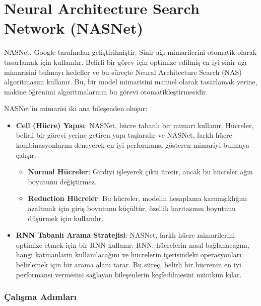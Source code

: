 \section{Neural Architecture Search Network (NASNet)}

NASNet, Google tarafından geliştirilmiştir. Sinir ağı mimarilerini otomatik olarak tasarlamak için kullanılır. Belirli bir görev için optimize edilmiş en iyi sinir ağı mimarisini bulmayı hedefler ve bu süreçte Neural Architecture Search (NAS) algoritmasını kullanır. Bu, bir model mimarisini manuel olarak tasarlamak yerine, makine öğrenimi algoritmalarının bu görevi otomatikleştirmesidir.

NASNet'in mimarisi iki ana bileşenden oluşur:

\begin{itemize}
    \item \textbf{Cell (Hücre) Yapısı}: NASNet, hücre tabanlı bir mimari kullanır. Hücreler, belirli bir görevi yerine getiren yapı taşlarıdır ve NASNet, farklı hücre kombinasyonlarını deneyerek en iyi performansı gösteren mimariyi bulmaya çalışır.
    \begin{itemize}
        \item \textbf{Normal Hücreler}: Girdiyi işleyerek çıktı üretir, ancak bu hücreler ağın boyutunu değiştirmez.
        \item \textbf{Reduction Hücreler}: Bu hücreler, modelin hesaplama karmaşıklığını azaltmak için giriş boyutunu küçültür, özellik haritasının boyutunu düşürmek için kullanılır. 
    \end{itemize}
    \item \textbf{RNN Tabanlı Arama Stratejisi}: NASNet, farklı hücre mimarilerini optimize etmek için bir RNN kullanır. RNN, hücrelerin nasıl bağlanacağını, hangi katmanların kullanılacağını ve hücrelerin içerisindeki operasyonları belirlemek için bir arama alanı tarar. Bu süreç, belirli bir hücrenin en iyi performansı vermesini sağlayan bileşenlerin keşfedilmesini mümkün kılar.
\end{itemize}

\subsubsection{Çalışma Adımları}


